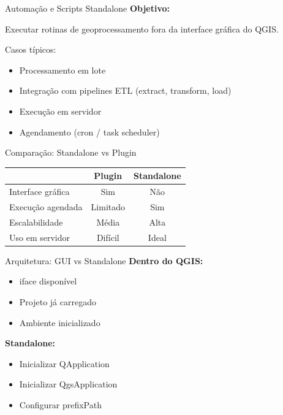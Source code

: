 \documentclass{beamer}
\begin{document}
\begin{frame}{Automação e Scripts Standalone}
    \textbf{Objetivo:}
    
    Executar rotinas de geoprocessamento fora da interface gráfica do QGIS.
    
    \vspace{0.4cm}
    
    Casos típicos:
    \begin{itemize}
        \item Processamento em lote
        \item Integração com pipelines ETL (extract, transform, load)
        \item Execução em servidor
        \item Agendamento (cron / task scheduler)
    \end{itemize}
\end{frame}

\begin{frame}{Comparação: Standalone vs Plugin}
    \centering
    \begin{tabular}{l|c|c}
        & Plugin & Standalone \\
        \hline
        Interface gráfica & Sim & Não \\
        Execução agendada & Limitado & Sim \\
        Escalabilidade & Média & Alta \\
        Uso em servidor & Difícil & Ideal \\
    \end{tabular}
\end{frame}

\begin{frame}{Arquitetura: GUI vs Standalone}
    \textbf{Dentro do QGIS:}
    \begin{itemize}
        \item iface disponível
        \item Projeto já carregado
        \item Ambiente inicializado
    \end{itemize}
    
    \vspace{0.4cm}
    
    \textbf{Standalone:}
    \begin{itemize}
        \item Inicializar QApplication
        \item Inicializar QgsApplication
        \item Configurar prefixPath
    \end{itemize}
\end{frame}
\end{document}

